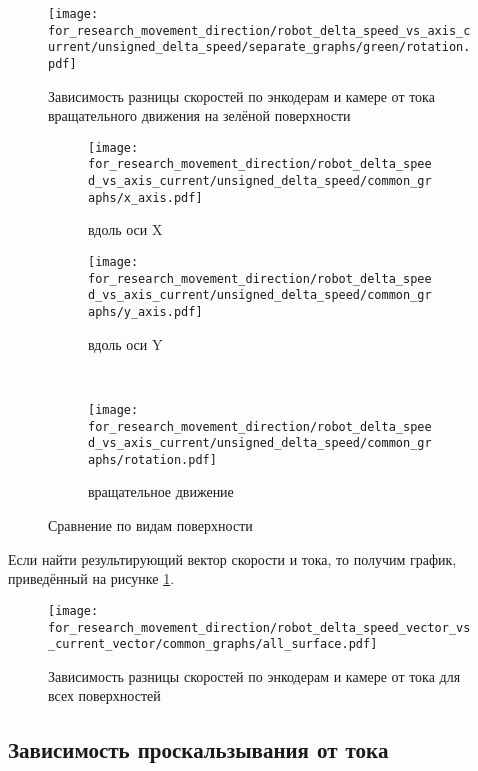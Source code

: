 \begin{figure}[H]
    \centering
    \texttt{[image: for\_research\_movement\_direction/robot\_delta\_speed\_vs\_axis\_current/unsigned\_delta\_speed/separate\_graphs/green/rotation.pdf]}
    \caption{Зависимость разницы скоростей по энкодерам и камере от тока вращательного движения на зелёной поверхности}
\end{figure}

\begin{figure}[H]
    \centering
    \begin{subfigure}{0.49\textwidth}
        \centering
        \texttt{[image: for\_research\_movement\_direction/robot\_delta\_speed\_vs\_axis\_current/unsigned\_delta\_speed/common\_graphs/x\_axis.pdf]}
        \caption{вдоль оси X}
    \end{subfigure}
    \hspace{0.005\textwidth}
    \begin{subfigure}{0.49\textwidth}
        \centering
        \texttt{[image: for\_research\_movement\_direction/robot\_delta\_speed\_vs\_axis\_current/unsigned\_delta\_speed/common\_graphs/y\_axis.pdf]}
        \caption{вдоль оси Y}
    \end{subfigure} \\
    \vspace{4pt}
    \centering
    \begin{subfigure}{0.49\textwidth}
        \centering
        \texttt{[image: for\_research\_movement\_direction/robot\_delta\_speed\_vs\_axis\_current/unsigned\_delta\_speed/common\_graphs/rotation.pdf]}
        \caption{вращательное движение}
    \end{subfigure}
    \caption{Сравнение по видам поверхности}
\end{figure}

Если найти результирующий вектор скорости и тока, то получим график, приведённый на рисунке \ref{fig:delta_robot_speed_vector_vs_current_vector}.

\begin{figure}[H]
    \centering
    \texttt{[image: for\_research\_movement\_direction/robot\_delta\_speed\_vector\_vs\_current\_vector/common\_graphs/all\_surface.pdf]}
    \caption{Зависимость разницы скоростей по энкодерам и камере от тока для всех поверхностей}
    \label{fig:delta_robot_speed_vector_vs_current_vector}
\end{figure}

\subsection{Зависимость проскальзывания от тока}

